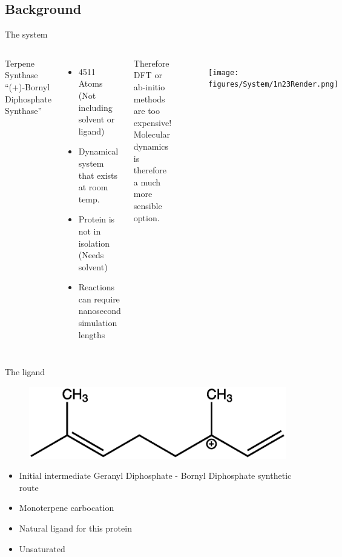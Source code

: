 \subsection{Background}
\begin{frame}{The system}
\begin{columns}
Terpene Synthase \enquote{(+)-Bornyl Diphosphate Synthase}
\begin{itemize}
	\item 4511 Atoms (Not including solvent or ligand)
	\item Dynamical system that exists at room temp.
	\item Protein is not in isolation (Needs solvent)
	\item Reactions can require nanosecond simulation lengths
\end{itemize}
\vspace{1cm}
Therefore DFT or ab-initio methods are too expensive!
Molecular dynamics is therefore a much more sensible option.
\begin{figure}
\texttt{[image: figures/System/1n23Render.png]}
\end{figure}

\end{columns}
\end{frame}


\begin{frame}{The ligand}
\begin{figure}
\includegraphics[height=0.3\textheight]{../Graphics/1n20Lig.eps}
\end{figure}
\begin{itemize}
\item	Initial intermediate Geranyl Diphosphate - Bornyl Diphosphate synthetic route
\item	Monoterpene carbocation
\item	Natural ligand for this protein 
\item	Unsaturated 
\end{itemize}
\end{frame}

